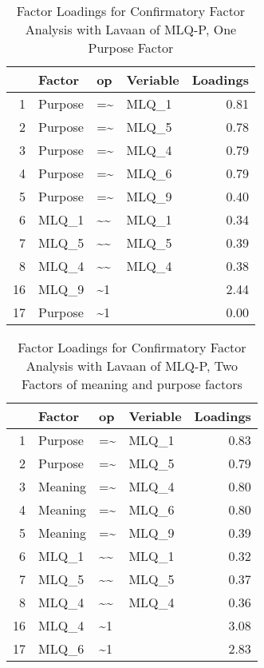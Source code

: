 \documentclass{article}\usepackage[]{graphicx}\usepackage[]{color}
\begin{document}
\begin{table}[ht]
\centering
\begin{tabular}{rlllr}
  \hline
 & Factor & op & Veriable & Loadings \\ 
  \hline
1 & Purpose & =\~{} & MLQ\_1 & 0.81 \\ 
  2 & Purpose & =\~{} & MLQ\_5 & 0.78 \\ 
  3 & Purpose & =\~{} & MLQ\_4 & 0.79 \\ 
  4 & Purpose & =\~{} & MLQ\_6 & 0.79 \\ 
  5 & Purpose & =\~{} & MLQ\_9 & 0.40 \\ 
  6 & MLQ\_1 & \~{}\~{} & MLQ\_1 & 0.34 \\ 
  7 & MLQ\_5 & \~{}\~{} & MLQ\_5 & 0.39 \\ 
  8 & MLQ\_4 & \~{}\~{} & MLQ\_4 & 0.38 \\ 
  16 & MLQ\_9 & \~{}1 &  & 2.44 \\ 
  17 & Purpose & \~{}1 &  & 0.00 \\ 
   \hline
\end{tabular}
\caption{Factor Loadings for Confirmatory Factor Analysis with Lavaan of MLQ-P, One Purpose Factor} 
\end{table}

\begin{table}[ht]
\centering
\begin{tabular}{rlllr}
  \hline
 & Factor & op & Veriable & Loadings \\ 
  \hline
1 & Purpose & =\~{} & MLQ\_1 & 0.83 \\ 
  2 & Purpose & =\~{} & MLQ\_5 & 0.79 \\ 
  3 & Meaning & =\~{} & MLQ\_4 & 0.80 \\ 
  4 & Meaning & =\~{} & MLQ\_6 & 0.80 \\ 
  5 & Meaning & =\~{} & MLQ\_9 & 0.39 \\ 
  6 & MLQ\_1 & \~{}\~{} & MLQ\_1 & 0.32 \\ 
  7 & MLQ\_5 & \~{}\~{} & MLQ\_5 & 0.37 \\ 
  8 & MLQ\_4 & \~{}\~{} & MLQ\_4 & 0.36 \\ 
  16 & MLQ\_4 & \~{}1 &  & 3.08 \\ 
  17 & MLQ\_6 & \~{}1 &  & 2.83 \\ 
   \hline
\end{tabular}
\caption{Factor Loadings for Confirmatory Factor Analysis with Lavaan of MLQ-P, Two Factors of meaning and purpose factors} 
\end{table}
\end{document}
